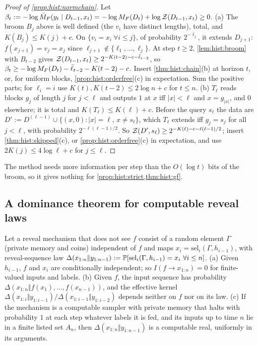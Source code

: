 \begin{proof}[Proof of \cref{prop:hist:normchain}]
Let $\beta_t:=-\log\bar{M}_{F}(y_t\mid D_{t-1},x_t)=-\log M_{F}(D_t)+\log\mathcal{Z}(D_{t-1},x_t)\ge0$.
(a) The broom $B_j$ above is well defined (the $v_i$ have distinct lengths), total, and $K(B_j)\le K(j)+c$. On $\{v_i=x_i\ \forall i\le j\}$, of probability $2^{-\bar\ell_j}$, it extends $D_{j+1}$: $f(x_{j+1})=v_j=x_j$ since $\ell_{j+1}\notin\{\ell_1,\dots,\ell_j\}$. At step $t\ge2$, \cref{lem:hist:broom} with $B_{t-2}$ gives $\mathcal{Z}(D_{t-1},x_t)\ge2^{-K(t-2)-c-\bar\ell_{t-2}}$, so $\beta_t\ge-\log M_{F}(D_t)-\bar\ell_{t-2}-K(t-2)-c$. Insert \cref{thm:hist:chain}(b) at horizon $t$, or, for uniform blocks, \cref{prop:hist:orderfree}(c) in expectation. Sum the positive parts; for $\ell_i=i$ use $K(t),K(t-2)\le2\log n+c$ for $t\le n$.
(b) $T_\ell$ reads blocks $g_j$ of length $j$ for $j<\ell$ and outputs $1$ at $x$ iff $|x|<\ell$ and $x=g_{|x|}$, and $0$ elsewhere; it is total and $K(T_\ell)\le K(\ell)+c$. Before the query $s_\ell$ the data are $D':=D^{(\ell-1)}\cup\{(x,0):|x|=\ell,\,x\ne s_\ell\}$, which $T_\ell$ extends iff $g_j=s_j$ for all $j<\ell$, with probability $2^{-\ell(\ell-1)/2}$. So $\mathcal{Z}(D',s_\ell)\ge2^{-K(\ell)-c-\ell(\ell-1)/2}$; insert \cref{thm:hist:skipped}(c), or \cref{prop:hist:orderfree}(c) in expectation, and use $2K(j)\le4\log\ell+c$ for $j\le\ell$.
\end{proof}

The method needs more information per step than the $O(\log t)$ bits of the broom, so it gives nothing for \cref{prop:hist:strict,thm:hist:gf}.

\subsection{A dominance theorem for computable reveal laws}\label{app:hist:thm1}

\begin{lemma}\label{lem:hist:memory}
Let a reveal mechanism that does not see $f$ consist of a random element $\Gamma$ (private memory and coins) independent of $f$ and maps $x_i=\mathrm{sel}_i(\Gamma,h_{i-1})$, with reveal-sequence law $\Delta(x_{1:n}\Vert y_{1:n-1}):=\mathbb{P}[\mathrm{sel}_i(\Gamma,h_{i-1})=x_i\ \forall i\le n]$. (a) Given $h_{i-1}$, $f$ and $x_i$ are conditionally independent; so $I(f\to x_{1:n})=0$ for finite-valued inputs and labels. (b) Given $f$, the input sequence has probability $\Delta(x_{1:n}\Vert f(x_1),\dots,f(x_{n-1}))$, and the effective kernel $\Delta(x_{1:i}\Vert y_{1:i-1})/\Delta(x_{1:i-1}\Vert y_{1:i-2})$ depends neither on $f$ nor on its law. (c) If the mechanism is a computable sampler with private memory that halts with probability $1$ at each step whatever labels it is fed, and its inputs up to time $n$ lie in a finite listed set $A_n$, then $\Delta(x_{1:n}\Vert y_{1:n-1})$ is a computable real, uniformly in its arguments.
\end{lemma}

